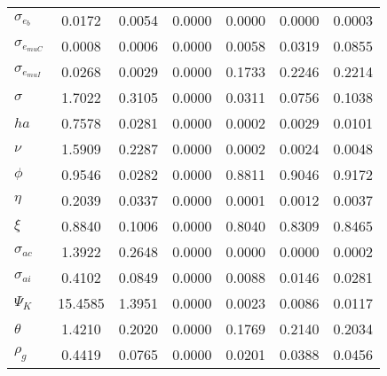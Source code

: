 \begin{center}
\begin{longtable}{lcccccc}
$ \sigma_{{e_b}}       $	 & 	          0.0172	 & 	          0.0054	 & 	          0.0000	 & 	          0.0000	 & 	          0.0000	 & 	          0.0003 \\ 
$ \sigma_{{e_{muC}}}   $	 & 	          0.0008	 & 	          0.0006	 & 	          0.0000	 & 	          0.0058	 & 	          0.0319	 & 	          0.0855 \\ 
$ \sigma_{{e_{muI}}}   $	 & 	          0.0268	 & 	          0.0029	 & 	          0.0000	 & 	          0.1733	 & 	          0.2246	 & 	          0.2214 \\ 
$ {\sigma}             $	 & 	          1.7022	 & 	          0.3105	 & 	          0.0000	 & 	          0.0311	 & 	          0.0756	 & 	          0.1038 \\ 
$ {ha}                 $	 & 	          0.7578	 & 	          0.0281	 & 	          0.0000	 & 	          0.0002	 & 	          0.0029	 & 	          0.0101 \\ 
$ \nu                  $	 & 	          1.5909	 & 	          0.2287	 & 	          0.0000	 & 	          0.0002	 & 	          0.0024	 & 	          0.0048 \\ 
$ {\phi}               $	 & 	          0.9546	 & 	          0.0282	 & 	          0.0000	 & 	          0.8811	 & 	          0.9046	 & 	          0.9172 \\ 
$ {\eta}               $	 & 	          0.2039	 & 	          0.0337	 & 	          0.0000	 & 	          0.0001	 & 	          0.0012	 & 	          0.0037 \\ 
$ \xi                  $	 & 	          0.8840	 & 	          0.1006	 & 	          0.0000	 & 	          0.8040	 & 	          0.8309	 & 	          0.8465 \\ 
$ {\sigma_{ac}}        $	 & 	          1.3922	 & 	          0.2648	 & 	          0.0000	 & 	          0.0000	 & 	          0.0000	 & 	          0.0002 \\ 
$ {\sigma_{ai}}        $	 & 	          0.4102	 & 	          0.0849	 & 	          0.0000	 & 	          0.0088	 & 	          0.0146	 & 	          0.0281 \\ 
$ {\Psi_{K}}           $	 & 	         15.4585	 & 	          1.3951	 & 	          0.0000	 & 	          0.0023	 & 	          0.0086	 & 	          0.0117 \\ 
$ {\theta}             $	 & 	          1.4210	 & 	          0.2020	 & 	          0.0000	 & 	          0.1769	 & 	          0.2140	 & 	          0.2034 \\ 
$ {\rho_g}             $	 & 	          0.4419	 & 	          0.0765	 & 	          0.0000	 & 	          0.0201	 & 	          0.0388	 & 	          0.0456 \\ 

\end{longtable}
\end{center}
